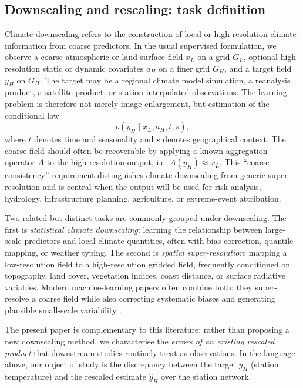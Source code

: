 \documentclass[a4paper,12pt,leqno]{article}
\begin{document}
\subsection{Downscaling and rescaling: task definition}

Climate downscaling refers to the construction of local or
high-resolution climate information from coarse predictors. In the usual
supervised formulation, we observe a coarse atmospheric or land-surface
field \(x_L\) on a grid \(G_L\), optional high-resolution static or
dynamic covariates \(a_H\) on a finer grid \(G_H\), and a target field
\(y_H\) on \(G_H\). The target may be a regional climate model
simulation, a reanalysis product, a satellite product, or
station-interpolated observations. The learning problem is therefore not
merely image enlargement, but estimation of the conditional law
\[
    p(y_H \mid x_L, a_H, t, s),
\]
where \(t\) denotes time and seasonality and \(s\) denotes geographical
context. The coarse field should often be recoverable by applying a known
aggregation operator \(A\) to the high-resolution output, i.e.
\(A(y_H) \approx x_L\). This ``coarse consistency'' requirement
distinguishes climate downscaling from generic super-resolution and is
central when the output will be used for risk analysis, hydrology,
infrastructure planning, agriculture, or extreme-event attribution.

Two related but distinct tasks are commonly grouped under downscaling.
The first is \emph{statistical climate downscaling}: learning the
relationship between large-scale predictors and local climate
quantities, often with bias correction, quantile mapping, or weather
typing. The second is \emph{spatial super-resolution}: mapping a
low-resolution field to a high-resolution gridded field, frequently
conditioned on topography, land cover, vegetation indices, coast
distance, or surface radiative variables. Modern machine-learning papers
often combine both: they super-resolve a coarse field while also
correcting systematic biases and generating plausible small-scale
variability
\parencite{maraun2018statistical_downscaling,labeurthre2024overview_downscaling}.

The present paper is complementary to this literature: rather than
proposing a new downscaling method, we characterise the \emph{errors of
an existing rescaled product} that downstream studies routinely treat as
observations. In the language above, our object of study is the
discrepancy between the target \(y_H\) (station temperature) and the
rescaled estimate \(\hat y_H\) over the station network.
\end{document}
